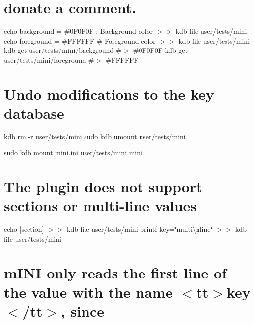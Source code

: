 \hypertarget{autotoc_md402_autotoc_md417}{}\section{donate a comment.}\label{autotoc_md402_autotoc_md417}
echo \textquotesingle{}background = \#0F0\+F0F ; Background color\textquotesingle{} $>$$>$ {\ttfamily kdb file user/tests/mini} echo \textquotesingle{}foreground = \#F\+F\+F\+F\+FF \# Foreground color\textquotesingle{} $>$$>$ {\ttfamily kdb file user/tests/mini} kdb get user/tests/mini/background \#$>$ \#0F0\+F0F kdb get user/tests/mini/foreground \#$>$ \#\+F\+F\+F\+F\+FF\hypertarget{autotoc_md402_autotoc_md418}{}\section{Undo modifications to the key database}\label{autotoc_md402_autotoc_md418}
kdb rm -\/r user/tests/mini sudo kdb umount user/tests/mini 
\begin{DoxyCode}{0}
\DoxyCodeLine{}
\DoxyCodeLine{}
\end{DoxyCode}
 sudo kdb mount mini.\+ini user/tests/mini mini\hypertarget{autotoc_md402_autotoc_md419}{}\section{The plugin does not support sections or multi-\/line values}\label{autotoc_md402_autotoc_md419}
echo \textquotesingle{}\mbox{[}section\mbox{]}\textquotesingle{} $>$$>$ {\ttfamily kdb file user/tests/mini} printf \textquotesingle{}key=\char`\"{}multi\textbackslash{}nline\char`\"{}\textquotesingle{} $>$$>$ {\ttfamily kdb file user/tests/mini}\hypertarget{autotoc_md402_autotoc_md420}{}\section{m\+I\+N\+I only reads the first line of the value with the name $<$tt$>$key$<$/tt$>$, since}\label{autotoc_md402_autotoc_md420}
